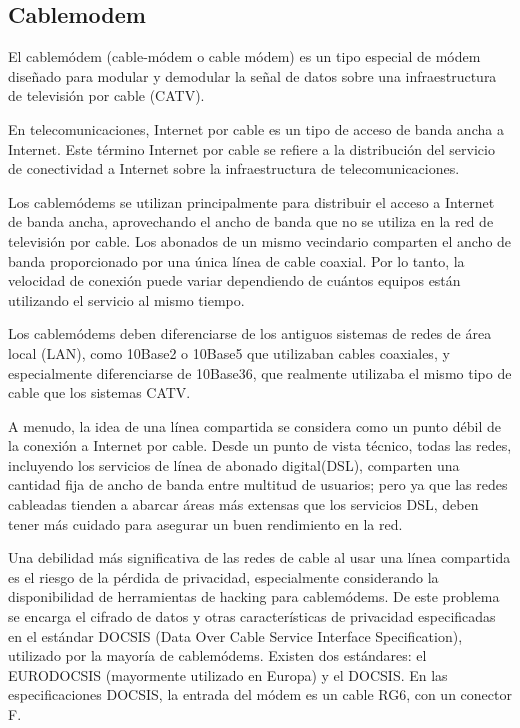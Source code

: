 \documentclass{report}
\begin{document}
\subsection*{Cablemodem}
El cablemódem (cable-módem o cable módem) es un tipo especial de módem diseñado para modular y demodular la señal de datos sobre una infraestructura de televisión por cable (CATV).\par
En telecomunicaciones, Internet por cable es un tipo de acceso de banda ancha a Internet. Este término Internet por cable se refiere a la distribución del servicio de conectividad a Internet sobre la infraestructura de telecomunicaciones.\par
Los cablemódems se utilizan principalmente para distribuir el acceso a Internet de banda ancha, aprovechando el ancho de banda que no se utiliza en la red de televisión por cable. Los abonados de un mismo vecindario comparten el ancho de banda proporcionado por una única línea de cable coaxial. Por lo tanto, la velocidad de conexión puede variar dependiendo de cuántos equipos están utilizando el servicio al mismo tiempo.\par
Los cablemódems deben diferenciarse de los antiguos sistemas de redes de área local (LAN), como 10Base2 o 10Base5 que utilizaban cables coaxiales, y especialmente diferenciarse de 10Base36, que realmente utilizaba el mismo tipo de cable que los sistemas CATV.\par
A menudo, la idea de una línea compartida se considera como un punto débil de la conexión a Internet por cable. Desde un punto de vista técnico, todas las redes, incluyendo los servicios de línea de abonado digital(DSL), comparten una cantidad fija de ancho de banda entre multitud de usuarios; pero ya que las redes cableadas tienden a abarcar áreas más extensas que los servicios DSL, deben tener más cuidado para asegurar un buen rendimiento en la red.\par
Una debilidad más significativa de las redes de cable al usar una línea compartida es el riesgo de la pérdida de privacidad, especialmente considerando la disponibilidad de herramientas de hacking para cablemódems. De este problema se encarga el cifrado de datos y otras características de privacidad especificadas en el estándar DOCSIS (Data Over Cable Service Interface Specification), utilizado por la mayoría de cablemódems. Existen dos estándares: el EURODOCSIS (mayormente utilizado en Europa) y el DOCSIS. En las especificaciones DOCSIS, la entrada del módem es un cable RG6, con un conector F.\par
\newpage
\end{document}
